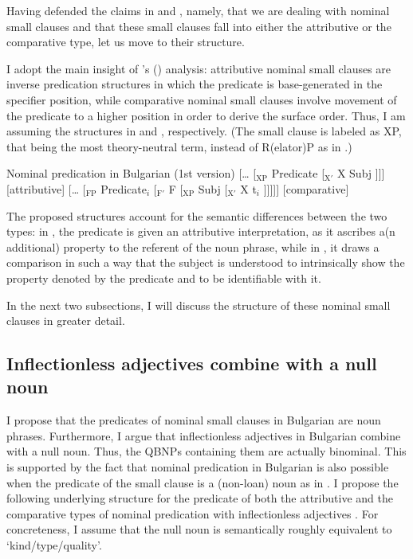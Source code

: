 \documentclass[output=paper]{langscibook}
\begin{document}
\noindent Having defended the claims in  and , namely, that we are dealing with nominal small clauses and that these small clauses fall into either the attributive or the comparative type, let us move to their structure. 

I adopt the main insight of \citeauthor{denDikken2006}'s (\citeyear{denDikken2006}) analysis: attributive nominal small clauses are inverse predication structures in which the predicate is base-generated in the specifier position, while comparative nominal small clauses involve movement of the predicate to a higher position in order to derive the surface order. Thus, I am assuming the structures in  and , respectively. (The small clause is labeled as XP, that being the most theory-neutral term, instead of R(elator)P as in \citealt{denDikken2006}.)

\ea Nominal predication in Bulgarian (1st version)
\ea \label{ge-br-bgattr1}
[\ldots{} [$_\text{XP}$ Predicate [$_{\text{X}'}$ X Subj ]]] \hfill [attributive]
\ex \label{ge-br-bgcmpr1}
[\ldots{} [$_\text{FP}$ Predicate$_{i}$ [$_{\text{F}'}$ F [$_\text{XP}$ Subj [$_{\text{X}'}$ X t$_{i}$ ]]]]] \hfill [comparative]
\z 
\z

\noindent The proposed structures account for the semantic differences between the two types: in , the predicate is given an attributive interpretation, as it ascribes a(n additional) property to the referent of the noun phrase, while in , it draws a comparison in such a way that the subject is understood to intrinsically show the property denoted by the predicate and to be identifiable with it. 

In the next two subsections, I will discuss the structure of these nominal small clauses in greater detail. 


\subsection{Inflectionless adjectives combine with a null noun} \label{ge-sec:3.2.2}

I propose that the predicates of nominal small clauses in Bulgarian are noun phrases. Furthermore, I argue that inflectionless adjectives in Bulgarian combine with a null noun. Thus, the QBNPs containing them are actually binominal. This is supported by the fact that nominal predication in Bulgarian is also possible when the predicate of the small clause is a (non-loan) noun as in . I propose the following underlying structure for the predicate of both the attributive and the comparative types of nominal predication with inflectionless adjectives . For concreteness, I assume that the null noun is semantically roughly equivalent to `kind/type/quality'.
\end{document}
